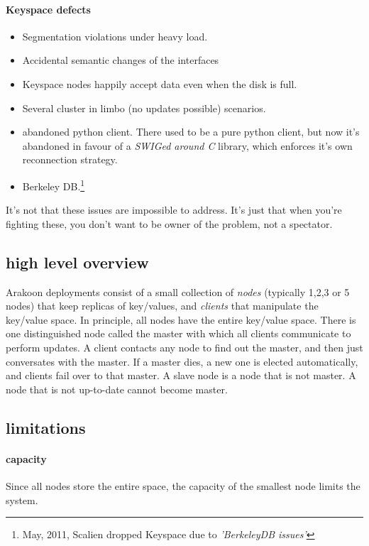 \paragraph{Keyspace defects}
\begin{itemize}

\item{} Segmentation violations under heavy load.
\item{} Accidental semantic changes of the interfaces
\item{} Keyspace nodes happily accept data even when the disk is full.
\item{} Several cluster in limbo (no updates possible) scenarios.
\item{} abandoned python client. There used to be a pure python client, 
but now it's abandoned in favour of a \emph{SWIGed around C} library, 
which enforces it's own reconnection strategy.
\item{} Berkeley DB.\footnote{May, 2011, Scalien dropped Keyspace due to \emph{'BerkeleyDB issues'}} 

\end{itemize}
It's not that these issues are impossible to address. It's just that when you're fighting these, you don't want to be owner of the problem, not a spectator.
\subsection{high level overview}
Arakoon deployments consist of a small collection of \emph{nodes} (typically 1,2,3 or 5 nodes) that keep replicas of key/values, and \emph{clients} that manipulate the key/value space.
In principle, all nodes have the entire key/value space.
There is one distinguished node called the master with which all clients communicate to perform updates.
A client contacts any node to find out the master, and then just conversates with the master.
If a master dies, a new one is elected automatically, and clients fail over to that master.
A slave node is a node that is not master.
A node that is not up-to-date cannot become master.

\subsection{limitations}
\paragraph{capacity}
Since all nodes store the entire space, the capacity of the smallest node limits the system.
